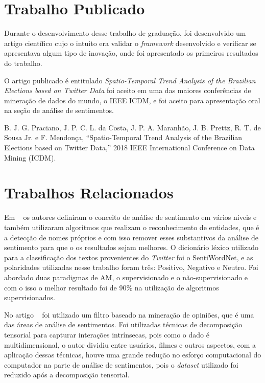 \section{Trabalho Publicado}

Durante o desenvolvimento desse trabalho de graduação, foi desenvolvido um artigo científico cujo o intuito era validar o \textit{framework} desenvolvido
e verificar se apresentava
algum tipo de inovação, onde foi apresentado os primeiros resultados do trabalho. 

O artigo publicado é entitulado \textit{Spatio-Temporal Trend Analysis of the Brazilian Elections based on Twitter Data} foi aceito em uma das maiores
conferências de mineração de dados do mundo, o \acrshort{IEEE} \acrshort{ICDM}, e foi aceito para apresentação oral na seção de análise de sentimentos.

B. J. G. Praciano, J. P. C. L. da Costa, J. P. A. Maranhão, J. B. Prettz, R. T. de Sousa Jr. e F. Mendonça, “Spatio-Temporal Trend Analysis of the Brazilian Elections based on Twitter Data,”  2018 IEEE International Conference on Data Mining (ICDM).


\section{Trabalhos Relacionados}

Em ~\cite{8474783} os autores definiram o conceito de análise de sentimento em vários níveis e também utilizaram algoritmos que realizam o reconhecimento de entidades, que é
a detecção de nomes próprios e com isso remover esses substantivos da análise de sentimento para que o os resultados sejam melhores. O dicionário léxico utilizado para a classificação
dos textos provenientes do \textit{Twitter} foi o SentiWordNet, e as polaridades utilizadas nesse trabalho foram três: Positivo, Negativo e Neutro. Foi abordado duas paradigmas
de \acrshort{AM}, o supervisionado e o não-supervisionado e com o isso o melhor resultado foi de 90\% na utilização de algoritmos supervisionados.


No artigo ~\cite{6413737} foi utilizado um filtro baseado na mineração de opiniões, que é uma das áreas de análise de sentimentos. Foi utilizadas técnicas de decomposição 
tensorial para capturar interações intrínsecas, pois como o dado é multidimensional, o autor dividiu entre usuários, filmes e outros aspectos, com a aplicação dessas técnicas,
houve uma grande redução no esforço computacional do computador na parte de análise de sentimentos, pois o \textit{dataset} utilizado foi reduzido após a decomposição tensorial.


